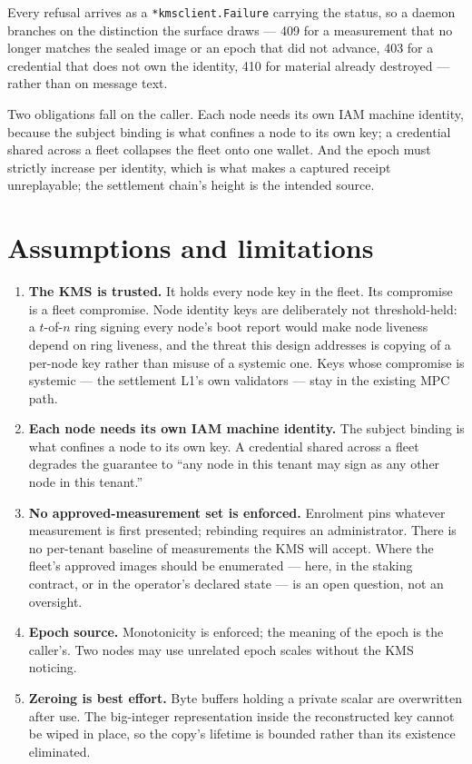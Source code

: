 \documentclass[11pt,a4paper]{article}
\newcommand{\code}[1]{\texttt{#1}}
\begin{document}
Every refusal arrives as a \code{*kmsclient.Failure} carrying the status, so a
daemon branches on the distinction the surface draws --- 409 for a measurement
that no longer matches the sealed image or an epoch that did not advance, 403 for
a credential that does not own the identity, 410 for material already destroyed
--- rather than on message text.

Two obligations fall on the caller. Each node needs its own IAM machine
identity, because the subject binding is what confines a node to its own key;
a credential shared across a fleet collapses the fleet onto one wallet. And the
epoch must strictly increase per identity, which is what makes a captured
receipt unreplayable; the settlement chain's height is the intended source.

\section{Assumptions and limitations}

\begin{enumerate}[leftmargin=*]
  \item \textbf{The KMS is trusted.} It holds every node key in the fleet. Its
    compromise is a fleet compromise. Node identity keys are deliberately not
    threshold-held: a $t$-of-$n$ ring signing every node's boot report would make
    node liveness depend on ring liveness, and the threat this design addresses
    is copying of a per-node key rather than misuse of a systemic one. Keys whose
    compromise is systemic --- the settlement L1's own validators --- stay in the
    existing MPC path.
  \item \textbf{Each node needs its own IAM machine identity.} The subject
    binding is what confines a node to its own key. A credential shared across a
    fleet degrades the guarantee to ``any node in this tenant may sign as any
    other node in this tenant.''
  \item \textbf{No approved-measurement set is enforced.} Enrolment pins whatever
    measurement is first presented; rebinding requires an administrator. There is
    no per-tenant baseline of measurements the KMS will accept. Where the fleet's
    approved images should be enumerated --- here, in the staking contract, or in
    the operator's declared state --- is an open question, not an oversight.
  \item \textbf{Epoch source.} Monotonicity is enforced; the meaning of the
    epoch is the caller's. Two nodes may use unrelated epoch scales without the
    KMS noticing.
  \item \textbf{Zeroing is best effort.} Byte buffers holding a private scalar are
    overwritten after use. The big-integer representation inside the reconstructed
    key cannot be wiped in place, so the copy's lifetime is bounded rather than
    its existence eliminated.
\end{enumerate}
\end{document}
